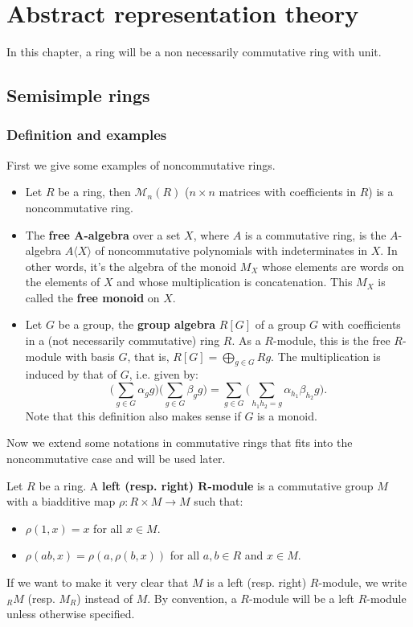 \chapter{Abstract representation theory}
In this chapter, a ring will be a non necessarily commutative ring with unit.
\section{Semisimple rings}
\subsection{Definition and examples}
First we give some examples of noncommutative rings.
\begin{example}
\mbox{}
\begin{itemize}
\item Let $R$ be a ring, then $\mathcal{M}_n(R)$ ($n\times n$ matrices with coefficients in $R$) is a noncommutative ring.
\item The \textbf{free $\bm{A}$-algebra} over a set $X$, where $A$ is a commutative ring, is the $A$-algebra $A\langle X\rangle$ of noncommutative polynomials with indeterminates in $X$. In other words, it's the algebra of the monoid $M_X$ whose elements are words on the elements of $X$ and whose multiplication is concatenation. This $M_X$ is called the \textbf{free monoid} on $X$.
\item Let $G$ be a group, the \textbf{group algebra} $R[G]$ of a group $G$ with coefficients in a (not necessarily commutative) ring $R$. As a $R$-module, this is the free $R$-module with basis $G$, that is, $R[G]=\bigoplus_{g\in G}Rg$. The multiplication is induced by that of $G$, i.e. given by:
\[\Big(\sum_{g\in G}\alpha_gg\Big)\Big(\sum_{g\in G}\beta_gg\Big)=\sum_{g\in G}\Big(\sum_{h_1h_2=g}\alpha_{h_1}\beta_{h_2}g\Big).\]
Note that this definition also makes sense if $G$ is a monoid.
\end{itemize}
\end{example}
Now we extend some notations in commutative rings that fits into the noncommutative case and will be used later.
\begin{definition}
Let $R$ be a ring. A \textbf{left (resp. right) $\bm{R}$-module} is a commutative group $M$
with a biadditive map $\rho:R\times M\to M$ such that:
\begin{itemize}
\item $\rho(1,x)=x$ for all $x\in M$.
\item $\rho(ab,x)=\rho(a,\rho(b,x))$ for all $a,b\in R$ and $x\in M$.
\end{itemize}
If we want to make it very clear that $M$ is a left (resp. right) $R$-module, we write $_{R}M$ (resp. $M_R$) instead of $M$. By convention, a $R$-module will be a left $R$-module unless otherwise specified.
\end{definition}
